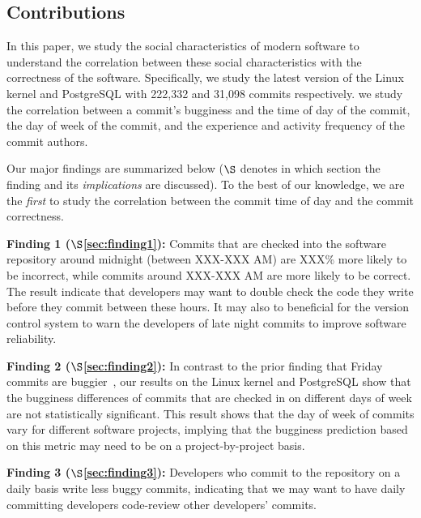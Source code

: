 \subsection{Contributions}
In this paper, we study the social characteristics of modern software to understand 
the correlation between these social characteristics with the correctness of the software.  
Specifically, we study the latest version of the Linux kernel and PostgreSQL with 222,332 and 31,098 commits respectively.
we study the correlation between a commit's bugginess
and the time of day of the commit, the day of week of the commit, and
the experience and activity frequency of the commit authors.

Our major findings 
are summarized below ($\S$ denotes in which
section the finding and its {\em implications} are discussed). To the best of our
knowledge, we are the {\em first} to study the correlation between the commit time of day and
the commit correctness. 

\begin{list}{}{\topsep=0pt\parsep=0pt\leftmargin=9pt\itemindent=0pt}

\vspace{0.05in}
\item {\bf Finding 1 ($\S$\ref{sec:finding1}):} 
Commits that are checked into the software repository around midnight (between XXX-XXX AM) 
are XXX\% more likely to be incorrect, while commits around XXX-XXX AM are more likely to be correct.
The result indicate that developers may want to double check the code they write  
before they commit between these hours. It may also to beneficial for the version control
system to warn the developers of late night commits to improve software reliability. 

\item {\bf Finding 2 ($\S$\ref{sec:finding2}):} 
In contrast to the prior finding that Friday commits are buggier~\cite{sliwerski-msr-2005}, 
our results on the Linux kernel and PostgreSQL show that 
the bugginess differences of commits that are checked in on different days of week 
are not statistically significant. This result shows that the day of week of commits
vary for different software projects, implying that the bugginess prediction based on this 
metric may need to be on a project-by-project basis.

\item {\bf Finding 3 ($\S$\ref{sec:finding3}):} 
Developers who commit to the repository on a daily basis
write less buggy commits, indicating that we may want to have daily
committing developers code-review other developers' commits.

\end{list}


